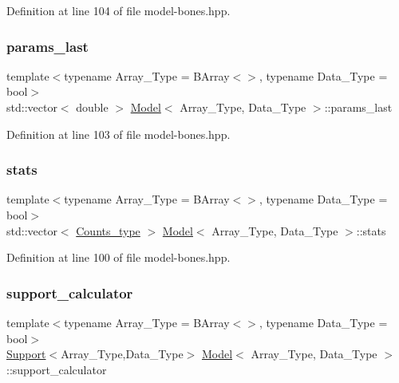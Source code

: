 Definition at line 104 of file model-\/bones.\+hpp.

\mbox{\label{class_model_aabe906408c76bb1d793720caddfb8bea}} 
\subsubsection{\texorpdfstring{params\+\_\+last}{params\_last}}
{\footnotesize\ttfamily template$<$typename Array\+\_\+\+Type  = B\+Array$<$$>$, typename Data\+\_\+\+Type  = bool$>$ \\
std\+::vector$<$ double $>$ \hyperlink{class_model}{Model}$<$ Array\+\_\+\+Type, Data\+\_\+\+Type $>$\+::params\+\_\+last}



Definition at line 103 of file model-\/bones.\+hpp.

\mbox{\label{class_model_a1816b0dd69226394643dc31916c8645e}} 
\subsubsection{\texorpdfstring{stats}{stats}}
{\footnotesize\ttfamily template$<$typename Array\+\_\+\+Type  = B\+Array$<$$>$, typename Data\+\_\+\+Type  = bool$>$ \\
std\+::vector$<$ \hyperlink{typedefs_8hpp_aee40fa17c1fddb63dd1f2b1470ade95b}{Counts\+\_\+type} $>$ \hyperlink{class_model}{Model}$<$ Array\+\_\+\+Type, Data\+\_\+\+Type $>$\+::stats}



Definition at line 100 of file model-\/bones.\+hpp.

\mbox{\label{class_model_a0bbd3396f6ab0c19cee3f6825ba98b6e}} 
\subsubsection{\texorpdfstring{support\+\_\+calculator}{support\_calculator}}
{\footnotesize\ttfamily template$<$typename Array\+\_\+\+Type  = B\+Array$<$$>$, typename Data\+\_\+\+Type  = bool$>$ \\
\hyperlink{class_support}{Support}$<$Array\+\_\+\+Type,Data\+\_\+\+Type$>$ \hyperlink{class_model}{Model}$<$ Array\+\_\+\+Type, Data\+\_\+\+Type $>$\+::support\+\_\+calculator}



